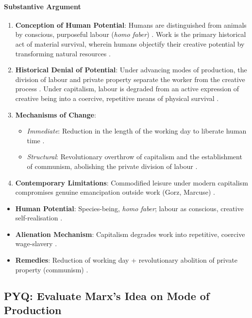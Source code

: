 \paragraph{Substantive Argument}
\begin{enumerate}
    \item \textbf{Conception of Human Potential}: Humans are distinguished from animals by conscious, purposeful labour (\textit{homo faber}) . Work is the primary historical act of material survival, wherein humans objectify their creative potential by transforming natural resources .
    \item \textbf{Historical Denial of Potential}: Under advancing modes of production, the division of labour and private property separate the worker from the creative process . Under capitalism, labour is degraded from an active expression of creative being into a coercive, repetitive means of physical survival .
    \item \textbf{Mechanisms of Change}:
    \begin{itemize}
        \item \textit{Immediate}: Reduction in the length of the working day to liberate human time .
        \item \textit{Structural}: Revolutionary overthrow of capitalism and the establishment of communism, abolishing the private division of labour .
    \end{itemize}
    \item \textbf{Contemporary Limitations}: Commodified leisure under modern capitalism compromises genuine emancipation outside work (Gorz, Marcuse) .
\end{enumerate}

\begin{QuickRevision}
\begin{itemize}
    \item \textbf{Human Potential}: Species-being, \textit{homo faber}; labour as conscious, creative self-realisation .
    \item \textbf{Alienation Mechanism}: Capitalism degrades work into repetitive, coercive wage-slavery .
    \item \textbf{Remedies}: Reduction of working day + revolutionary abolition of private property (communism) .
\end{itemize}
\end{QuickRevision}

\subsection{PYQ: Evaluate Marx's Idea on Mode of Production}

